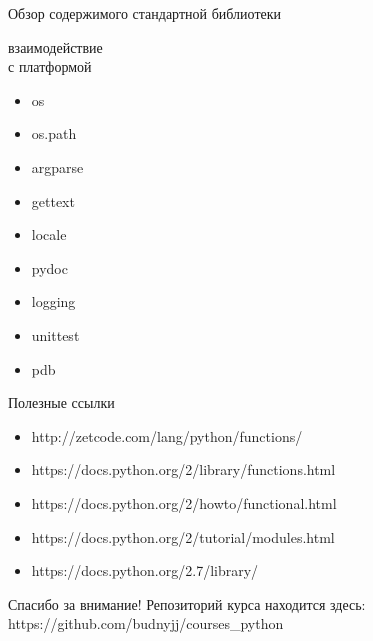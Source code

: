 \documentclass[hyperref={pdftex,unicode}]{beamer}
\begin{document}
\begin{frame}{Обзор содержимого стандартной библиотеки}
{\begin{minipage}{0.2\linewidth}
      взаимодействие \\
      с платформой
    \begin{itemize}
    \item os
    \item os.path
    \item argparse
    \item gettext
    \item locale
    \item pydoc
    \item logging
    \item unittest
    \item pdb    
    \end{itemize}
  \end{minipage}
}
\end{frame}

\begin{frame}{Полезные ссылки}
  \begin{itemize}
    \item http://zetcode.com/lang/python/functions/
    \item https://docs.python.org/2/library/functions.html
    \item https://docs.python.org/2/howto/functional.html
    \item https://docs.python.org/2/tutorial/modules.html
    \item https://docs.python.org/2.7/library/
  \end{itemize}
\end{frame}

\begin{frame}{  Спасибо за внимание!}
  Репозиторий курса находится здесь: \\
  https://github.com/budnyjj/courses\_python
\end{frame}
\end{document}
